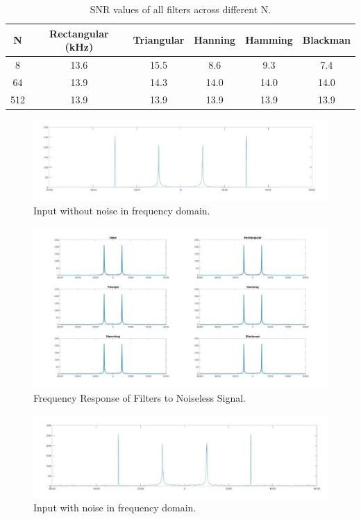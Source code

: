 \documentclass{article}
\begin{document}
\begin{table}
\centering
\caption{SNR values of all filters across different N.}
\begin{tabular}{||c c c c c c||} 
 \hline
 N & Rectangular (kHz) & Triangular & Hanning & Hamming & Blackman\\ [0.5ex] 
 \hline\hline
 8 & 13.6 & 15.5 & 8.6 & 9.3 & 7.4 \\
 64 & 13.9 & 14.3 & 14.0 & 14.0 & 14.0 \\
 512 & 13.9 & 13.9 & 13.9 & 13.9 & 13.9 \\ 
 \hline
\end{tabular}
\end{table}

\begin{figure}[H]
    \includegraphics[width=\textwidth]
    {input_wave.jpg}
    \caption{Input without noise in frequency domain.}
    \end{figure}
    \begin{figure}[H]
    \includegraphics[width=\textwidth]
    {pure_response.jpg}
    \caption{Frequency Response of Filters to Noiseless Signal.}
    \end{figure}
    \begin{figure}[H]
    \includegraphics[width=\textwidth]
    {noisy_input.jpg}
    \caption{Input with noise in frequency domain.}
    \end{figure}
\end{document}
